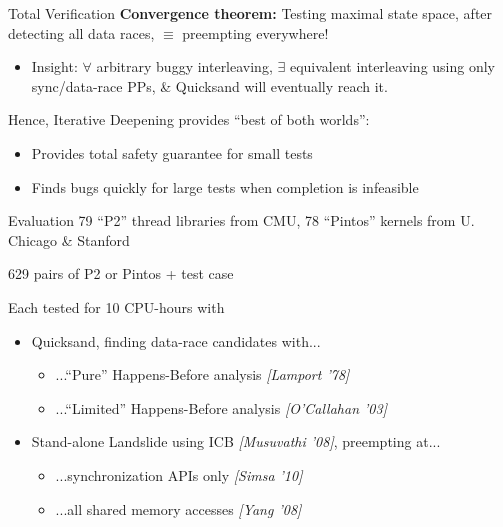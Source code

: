 \documentclass[xcolor=dvipsnames]{beamer}
\begin{document}
\begin{frame}{Total Verification}
	\textbf{Convergence theorem:} Testing maximal state space, after detecting all data races, $\equiv$ preempting everywhere!
	\begin{itemize}
		\item Insight: $\forall$ arbitrary buggy interleaving, $\exists$ equivalent interleaving %
			using only sync/data-race PPs, \& Quicksand will eventually reach it.
	\end{itemize}
	\linegap

	Hence, Iterative Deepening provides ``best of both worlds'':
	\begin{itemize}
		\item Provides total safety guarantee for small tests
		\item Finds bugs quickly for large tests when completion is infeasible
	\end{itemize}
\end{frame}

\begin{frame}{Evaluation}
	79 ``P2'' thread libraries from CMU, 78 ``Pintos'' kernels from U. Chicago \& Stanford
	\linegap

	629 pairs of P2 or Pintos + test case
	\linegap

	Each tested for 10 CPU-hours with
	\begin{itemize}
		\item Quicksand, finding data-race candidates with...
			\begin{itemize}
				\item ...``Pure'' Happens-Before analysis {\em [Lamport '78]}
				\item ...``Limited'' Happens-Before analysis {\em [O'Callahan '03]}
			\end{itemize}
		\item Stand-alone Landslide using ICB {\em [Musuvathi '08]}, preempting at...
			\begin{itemize}
				\item ...synchronization APIs only {\em [Simsa '10]}
				\item ...all shared memory accesses
					{\em [Yang '08]} %
			\end{itemize}
	\end{itemize}
\end{frame}
\end{document}
